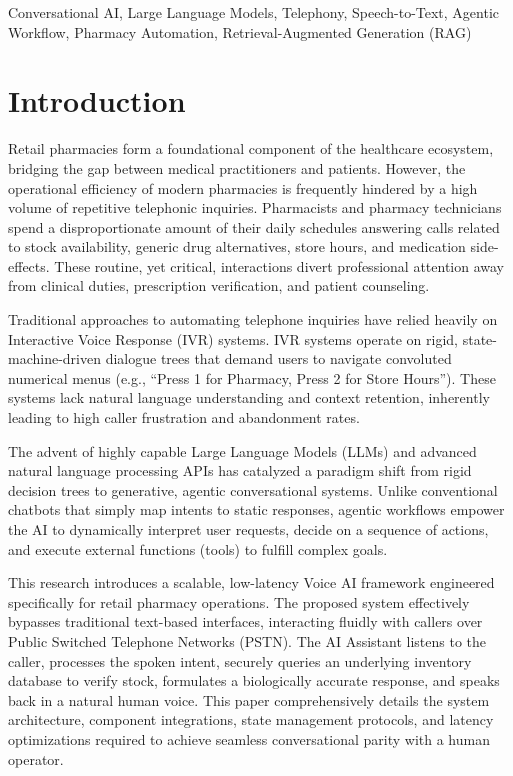 \documentclass[conference,a4paper]{IEEEtran}
\begin{document}
\begin{IEEEkeywords}
Conversational AI, Large Language Models, Telephony, Speech-to-Text, Agentic Workflow, Pharmacy Automation, Retrieval-Augmented Generation (RAG)
\end{IEEEkeywords}

\section{Introduction}
Retail pharmacies form a foundational component of the healthcare ecosystem, bridging the gap between medical practitioners and patients. However, the operational efficiency of modern pharmacies is frequently hindered by a high volume of repetitive telephonic inquiries. Pharmacists and pharmacy technicians spend a disproportionate amount of their daily schedules answering calls related to stock availability, generic drug alternatives, store hours, and medication side-effects. These routine, yet critical, interactions divert professional attention away from clinical duties, prescription verification, and patient counseling. 

Traditional approaches to automating telephone inquiries have relied heavily on Interactive Voice Response (IVR) systems. IVR systems operate on rigid, state-machine-driven dialogue trees that demand users to navigate convoluted numerical menus (e.g., ``Press 1 for Pharmacy, Press 2 for Store Hours''). These systems lack natural language understanding and context retention, inherently leading to high caller frustration and abandonment rates. 

The advent of highly capable Large Language Models (LLMs) and advanced natural language processing APIs has catalyzed a paradigm shift from rigid decision trees to generative, agentic conversational systems. Unlike conventional chatbots that simply map intents to static responses, agentic workflows empower the AI to dynamically interpret user requests, decide on a sequence of actions, and execute external functions (tools) to fulfill complex goals. 

This research introduces a scalable, low-latency Voice AI framework engineered specifically for retail pharmacy operations. The proposed system effectively bypasses traditional text-based interfaces, interacting fluidly with callers over Public Switched Telephone Networks (PSTN). The AI Assistant listens to the caller, processes the spoken intent, securely queries an underlying inventory database to verify stock, formulates a biologically accurate response, and speaks back in a natural human voice. This paper comprehensively details the system architecture, component integrations, state management protocols, and latency optimizations required to achieve seamless conversational parity with a human operator.
\end{document}
